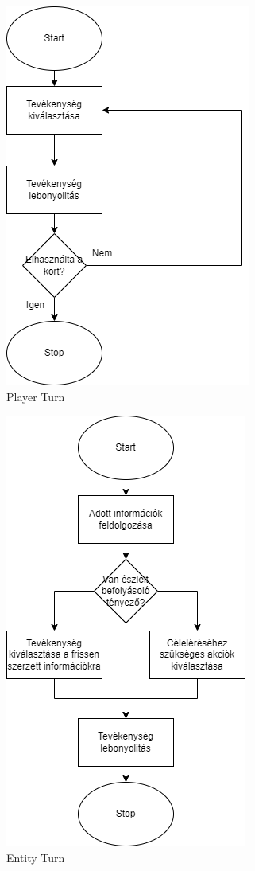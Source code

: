 \begin{figure}[!ht]
	\centering
	\includegraphics[scale=1]{images/playerturnUML.png}
	\caption{Player Turn}
	\label{fig:playerturn}
\end{figure}

\begin{figure}[!ht]
	\centering
	\includegraphics[scale=1]{images/entityturnUML.png}
	\caption{Entity Turn}
	\label{fig:entityturn}
\end{figure}

